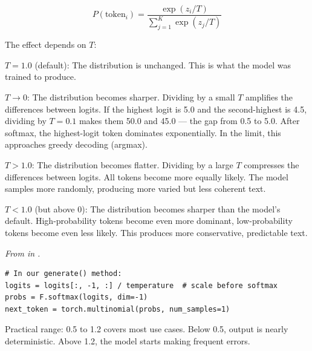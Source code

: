 \[P(\text{token}_i) = \frac{\exp(z_i / T)}{\sum_{j=1}^{K} \exp(z_j / T)}\]

The effect depends on $T$:

\textbf{$T = 1.0$} (default): The distribution is unchanged. This is what the model was trained to produce.

\textbf{$T \to 0$}: The distribution becomes sharper. Dividing by a small $T$ amplifies the differences between logits. If the highest logit is 5.0 and the second-highest is 4.5, dividing by $T = 0.1$ makes them 50.0 and 45.0 --- the gap from 0.5 to 5.0. After softmax, the highest-logit token dominates exponentially. In the limit, this approaches greedy decoding (argmax).

\textbf{$T > 1.0$}: The distribution becomes flatter. Dividing by a large $T$ compresses the differences between logits. All tokens become more equally likely. The model samples more randomly, producing more varied but less coherent text.

\textbf{$T < 1.0$} (but above 0): The distribution becomes sharper than the model's default. High-probability tokens become even more dominant, low-probability tokens become even less likely. This produces more conservative, predictable text.

\concepttag
{\small\itshape From  in .}
\begin{lstlisting}
# In our generate() method:
logits = logits[:, -1, :] / temperature  # scale before softmax
probs = F.softmax(logits, dim=-1)
next_token = torch.multinomial(probs, num_samples=1)
\end{lstlisting}

Practical range: 0.5 to 1.2 covers most use cases. Below 0.5, output is nearly deterministic. Above 1.2, the model starts making frequent errors.


